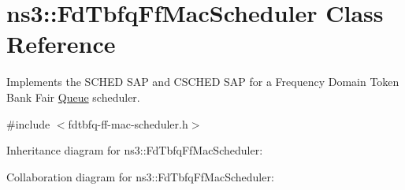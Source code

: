 \hypertarget{classns3_1_1FdTbfqFfMacScheduler}{}\section{ns3\+:\+:Fd\+Tbfq\+Ff\+Mac\+Scheduler Class Reference}
\label{classns3_1_1FdTbfqFfMacScheduler}


Implements the S\+C\+H\+ED S\+AP and C\+S\+C\+H\+ED S\+AP for a Frequency Domain Token Bank Fair \hyperlink{classns3_1_1Queue}{Queue} scheduler.  




{\ttfamily \#include $<$fdtbfq-\/ff-\/mac-\/scheduler.\+h$>$}



Inheritance diagram for ns3\+:\+:Fd\+Tbfq\+Ff\+Mac\+Scheduler\+:


Collaboration diagram for ns3\+:\+:Fd\+Tbfq\+Ff\+Mac\+Scheduler\+:
